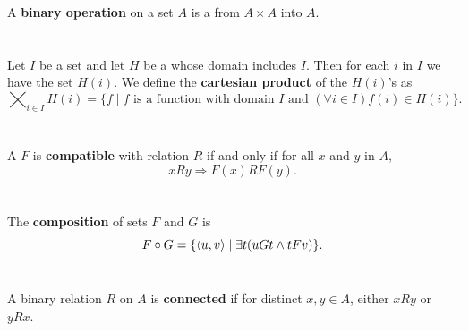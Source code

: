 \documentclass{report}
\begin{document}
  A \textbf{binary operation} on a set $A$ is a  from
    $A \times A$ into $A$.

\section{}%

  Let $I$ be a set and let $H$ be a  whose domain includes
    $I$.
  Then for each $i$ in $I$ we have the set $H(i)$.
  We define the \textbf{cartesian product} of the $H(i)$'s as
    $$\bigtimes_{i \in I} H(i) = \{f \mid
      f \text{ is a function with domain } I \text{ and }
        (\forall i \in I) f(i) \in H(i)\}.$$


\section{}%

  A  $F$ is \textbf{compatible} with relation $R$ if and
    only if for all $x$ and $y$ in $A$,
    $$xRy \Rightarrow F(x)RF(y).$$


\section{}%

  The \textbf{composition} of sets $F$ and $G$ is
    $$F \circ G = \{\left< u, v \right> \mid \exists t(uGt \land tFv)\}.$$



\section{}%

  A binary relation $R$ on $A$ is \textbf{connected} if for distinct
    $x, y \in A$, either $xRy$ or $yRx$.


\section{}%
\end{document}
